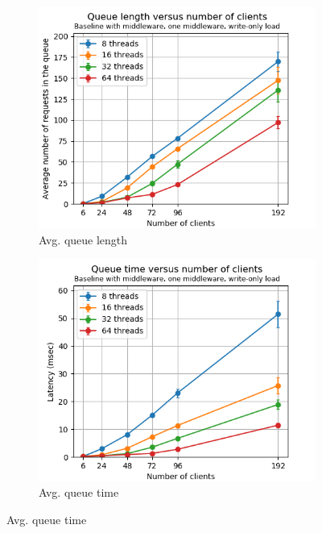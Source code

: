 \documentclass[11pt,a4paper]{article}
\begin{document}
\begin{figure}[h]
\centering
\begin{subfigure}{.33\textwidth}
  \centering
  \includegraphics[width=1.0\linewidth,trim={0px 0px 0px 0px},clip]{img/plot/mwb1-wo-qlen-mini.png}
  \caption{Avg. queue length}
  \label{fig:mwb1-wo-qlen-mini}
\end{subfigure}%
\begin{subfigure}{.33\textwidth}
  \centering
  \includegraphics[width=1.0\linewidth,trim={0px 0px 0px 0px},clip]{img/plot/mwb1-wo-qtime-mini.png}
  \caption{Avg. queue time}
  \label{fig:mwb1-wo-qtime-mini}

\end{subfigure}
\end{figure}
\end{document}
